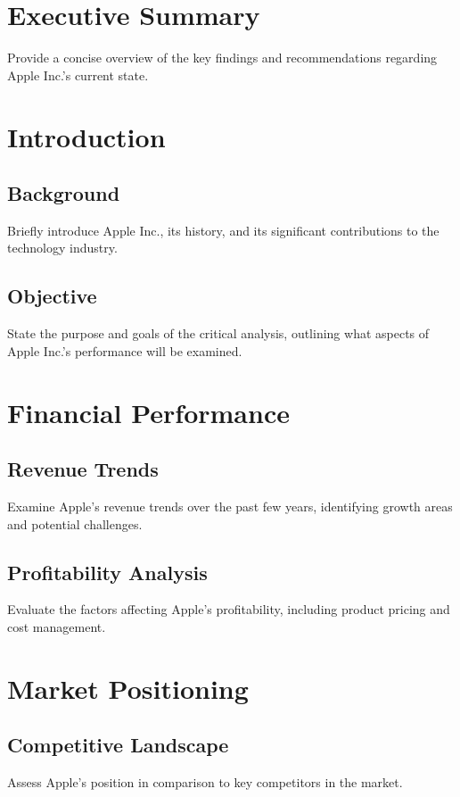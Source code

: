 \documentclass{article}
\begin{document}
\section{Executive Summary}
Provide a concise overview of the key findings and recommendations regarding Apple Inc.'s current state.

\section{Introduction}

\subsection{Background}
Briefly introduce Apple Inc., its history, and its significant contributions to the technology industry.

\subsection{Objective}
State the purpose and goals of the critical analysis, outlining what aspects of Apple Inc.'s performance will be examined.

\section{Financial Performance}

\subsection{Revenue Trends}
Examine Apple's revenue trends over the past few years, identifying growth areas and potential challenges.

\subsection{Profitability Analysis}
Evaluate the factors affecting Apple's profitability, including product pricing and cost management.

\section{Market Positioning}

\subsection{Competitive Landscape}
Assess Apple's position in comparison to key competitors in the market.
\end{document}
